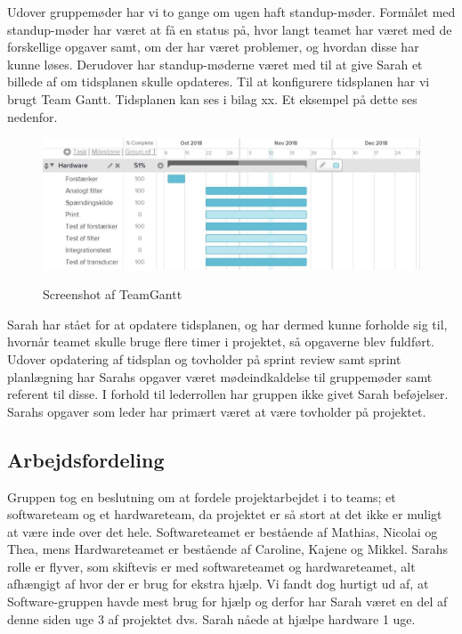 Udover gruppemøder har vi to gange om ugen haft standup-møder. Formålet med standup-møder har været at få en status på, hvor langt teamet har været med de forskellige opgaver samt, om der har været problemer, og hvordan disse har kunne løses. Derudover har standup-møderne været med til at give Sarah et billede af om tidsplanen skulle opdateres. Til at konfigurere tidsplanen har vi brugt Team Gantt. Tidsplanen kan ses i bilag xx. Et eksempel på dette ses nedenfor. 

	\begin{figure}[h!]
	\centering
	\includegraphics[width=0.9\linewidth]{Udviklingsproces/Metode/TeamGantt}
	\label{fig:teamgantt}
	\caption{Screenshot af TeamGantt}
\end{figure}

Sarah har stået for at opdatere tidsplanen, og har dermed kunne forholde sig til, hvornår teamet skulle bruge flere timer i projektet, så opgaverne blev fuldført. Udover opdatering af tidsplan og tovholder på sprint review samt sprint planlægning har Sarahs opgaver været mødeindkaldelse til gruppemøder samt referent til disse. I forhold til lederrollen har gruppen ikke givet Sarah beføjelser. Sarahs opgaver som leder har primært været at være tovholder på projektet. 

\subsection{Arbejdsfordeling}
Gruppen tog en beslutning om at fordele projektarbejdet i to teams; et softwareteam og et hardwareteam, da projektet er så stort at det ikke er muligt at være inde over det hele. Softwareteamet er bestående af Mathias, Nicolai og Thea, mens Hardwareteamet er bestående af Caroline, Kajene og Mikkel. Sarahs rolle er flyver, som skiftevis er med softwareteamet og hardwareteamet, alt afhængigt af hvor der er brug for ekstra hjælp. Vi fandt dog hurtigt ud af, at Software-gruppen havde mest brug for hjælp og derfor har Sarah været en del af denne siden uge 3 af projektet dvs. Sarah nåede at hjælpe hardware 1 uge.

